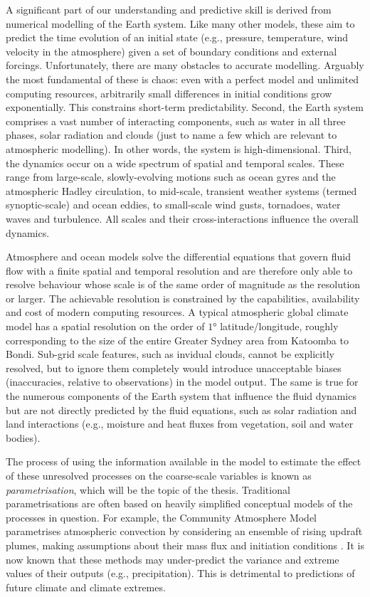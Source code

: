 \documentclass[titlepage]{article}
\begin{document}
A significant part of our understanding and predictive skill is derived from
numerical modelling of the Earth system. Like many other models, these aim
to predict the time evolution of an initial state (e.g., pressure, temperature,
wind velocity in the atmosphere) given a set of boundary conditions and
external forcings.
Unfortunately, there are many obstacles to accurate modelling. Arguably the
most fundamental of these is chaos: even with a perfect model and unlimited
computing resources, arbitrarily small differences in initial conditions
grow exponentially. This constrains short-term predictability. Second,
the Earth system comprises a vast number of interacting components, such as
water in all three phases, solar radiation and clouds (just to name a few which
are relevant to atmospheric modelling). In other words, the system is
high-dimensional. Third, the dynamics occur on a wide spectrum of spatial
and temporal scales. These range from large-scale, slowly-evolving motions
such as ocean gyres and the atmospheric Hadley circulation, to mid-scale,
transient weather systems (termed synoptic-scale) and ocean eddies, to
small-scale wind gusts, tornadoes, water waves and turbulence. All scales
and their cross-interactions influence the overall dynamics.

Atmosphere and ocean models solve the differential equations that govern fluid
flow with a finite spatial and temporal resolution and are therefore only able
to resolve behaviour whose scale is of the same order of magnitude as the
resolution or larger. The achievable resolution is constrained by the
capabilities, availability and cost of modern computing resources. A typical
atmospheric global climate model has a spatial resolution on the order of
$\ang{1}$ latitude/longitude, roughly corresponding to the size of the entire
Greater Sydney area from Katoomba to Bondi. Sub-grid scale features, such as
invidual clouds, cannot be explicitly resolved, but to ignore them completely
would introduce unacceptable biases (inaccuracies, relative to observations)
in the model output. The same is true for the numerous components of the
Earth system that influence the fluid dynamics but are not directly predicted
by the fluid equations, such as solar radiation and land interactions (e.g.,
moisture and heat fluxes from vegetation, soil and water bodies).

The process of using the information available in the model to estimate the
effect of these unresolved processes on the coarse-scale variables is known as
\emph{parametrisation}, which will be the topic of the thesis. Traditional
parametrisations are often based on heavily simplified conceptual models of the
processes in question. For example, the Community Atmosphere Model
\parencite{cam5} parametrises atmospheric convection by considering an
ensemble of rising updraft plumes, making assumptions about their mass flux
and initiation conditions \parencite{zhang1995}. It is now known that these
methods may under-predict the variance and extreme values of their outputs
(e.g., precipitation). %
This is detrimental to predictions of future climate and climate extremes.
\end{document}
